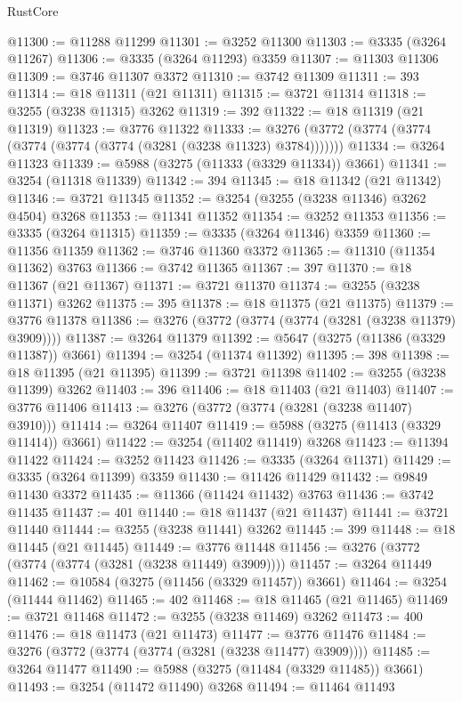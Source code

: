 \begin{lexlean}{RustCore}
\begin{coremodule}
@11300 := @11288 @11299
@11301 := @3252 @11300
@11303 := @3335 (@3264 @11267)
@11306 := @3335 (@3264 @11293) @3359
@11307 := @11303 @11306
@11309 := @3746 @11307 @3372
@11310 := @3742 @11309
@11311 := 393
@11314 := @18 @11311 (@21 @11311)
@11315 := @3721 @11314
@11318 := @3255 (@3238 @11315) @3262
@11319 := 392
@11322 := @18 @11319 (@21 @11319)
@11323 := @3776 @11322
@11333 := @3276 (@3772 (@3774 (@3774 (@3774 (@3774 (@3774 (@3281 (@3238 @11323) @3784)))))))
@11334 := @3264 @11323
@11339 := @5988 (@3275 (@11333 (@3329 @11334)) @3661)
@11341 := @3254 (@11318 @11339)
@11342 := 394
@11345 := @18 @11342 (@21 @11342)
@11346 := @3721 @11345
@11352 := @3254 (@3255 (@3238 @11346) @3262 @4504) @3268
@11353 := @11341 @11352
@11354 := @3252 @11353
@11356 := @3335 (@3264 @11315)
@11359 := @3335 (@3264 @11346) @3359
@11360 := @11356 @11359
@11362 := @3746 @11360 @3372
@11365 := @11310 (@11354 @11362) @3763
@11366 := @3742 @11365
@11367 := 397
@11370 := @18 @11367 (@21 @11367)
@11371 := @3721 @11370
@11374 := @3255 (@3238 @11371) @3262
@11375 := 395
@11378 := @18 @11375 (@21 @11375)
@11379 := @3776 @11378
@11386 := @3276 (@3772 (@3774 (@3774 (@3281 (@3238 @11379) @3909))))
@11387 := @3264 @11379
@11392 := @5647 (@3275 (@11386 (@3329 @11387)) @3661)
@11394 := @3254 (@11374 @11392)
@11395 := 398
@11398 := @18 @11395 (@21 @11395)
@11399 := @3721 @11398
@11402 := @3255 (@3238 @11399) @3262
@11403 := 396
@11406 := @18 @11403 (@21 @11403)
@11407 := @3776 @11406
@11413 := @3276 (@3772 (@3774 (@3281 (@3238 @11407) @3910)))
@11414 := @3264 @11407
@11419 := @5988 (@3275 (@11413 (@3329 @11414)) @3661)
@11422 := @3254 (@11402 @11419) @3268
@11423 := @11394 @11422
@11424 := @3252 @11423
@11426 := @3335 (@3264 @11371)
@11429 := @3335 (@3264 @11399) @3359
@11430 := @11426 @11429
@11432 := @9849 @11430 @3372
@11435 := @11366 (@11424 @11432) @3763
@11436 := @3742 @11435
@11437 := 401
@11440 := @18 @11437 (@21 @11437)
@11441 := @3721 @11440
@11444 := @3255 (@3238 @11441) @3262
@11445 := 399
@11448 := @18 @11445 (@21 @11445)
@11449 := @3776 @11448
@11456 := @3276 (@3772 (@3774 (@3774 (@3281 (@3238 @11449) @3909))))
@11457 := @3264 @11449
@11462 := @10584 (@3275 (@11456 (@3329 @11457)) @3661)
@11464 := @3254 (@11444 @11462)
@11465 := 402
@11468 := @18 @11465 (@21 @11465)
@11469 := @3721 @11468
@11472 := @3255 (@3238 @11469) @3262
@11473 := 400
@11476 := @18 @11473 (@21 @11473)
@11477 := @3776 @11476
@11484 := @3276 (@3772 (@3774 (@3774 (@3281 (@3238 @11477) @3909))))
@11485 := @3264 @11477
@11490 := @5988 (@3275 (@11484 (@3329 @11485)) @3661)
@11493 := @3254 (@11472 @11490) @3268
@11494 := @11464 @11493

\end{coremodule}
\end{lexlean}
